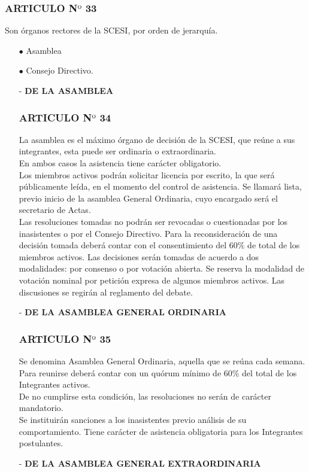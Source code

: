 \documentclass[11pt,letterpaper]{book}
\begin{document}
\subsubsection*{ARTICULO N$º$ 33}
Son órganos rectores de la SCESI, por orden de jerarquía. 
\begin{itemize}
\item[$\bullet$] Asamblea  
\item[$\bullet$] Consejo Directivo. 
\end{itemize}
\begin{itemize}
\item[-] {\bf DE LA ASAMBLEA}
\subsubsection*{ARTICULO N$º$ 34}
La asamblea es el máximo órgano de decisión de la SCESI, que reúne a sus integrantes,  esta puede ser ordinaria o extraordinaria.\\
En ambos casos la asistencia tiene carácter obligatorio.\\
Los miembros activos podrán solicitar licencia por escrito, la que será públicamente leída, en el momento del control de asistencia. Se llamará lista, previo inicio de la asamblea General Ordinaria, cuyo encargado será el secretario de Actas.\\
Las resoluciones tomadas no podrán ser revocadas o cuestionadas por los inasistentes o por el Consejo Directivo. Para la reconsideración de una decisión tomada deberá contar con el consentimiento del 60\% de total de los miembros activos. Las decisiones serán tomadas de acuerdo a dos modalidades: por consenso o por votación abierta. Se reserva la modalidad de votación nominal por petición expresa de algunos miembros activos. Las discusiones se regirán al reglamento del debate.
\item[-] {\bf DE LA ASAMBLEA GENERAL ORDINARIA}
\subsubsection*{ARTICULO N$º$ 35}
Se denomina Asamblea General Ordinaria, aquella que se reúna cada semana. 
Para reunirse deberá contar con un quórum mínimo de 60\% del total de los Integrantes activos.\\
De no cumplirse esta condición, las resoluciones no serán de carácter mandatorio.\\
Se instituirán sanciones a los inasistentes previo análisis de su comportamiento. Tiene carácter de asistencia obligatoria para los Integrantes postulantes.
\item[-] {\bf DE LA ASAMBLEA GENERAL EXTRAORDINARIA}

\end{itemize}
\end{document}
